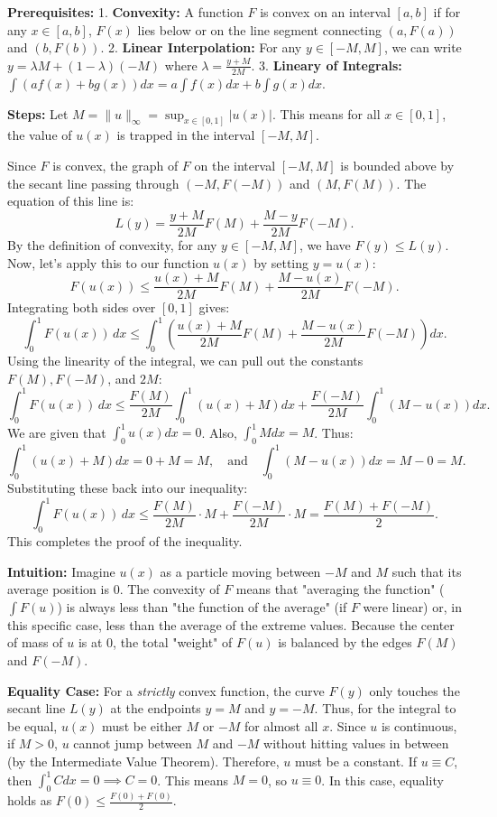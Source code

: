 \begin{solution}
\textbf{Prerequisites:}
1. \textbf{Convexity:} A function $F$ is convex on an interval $[a, b]$ if for any $x \in [a, b]$, $F(x)$ lies below or on the line segment connecting $(a, F(a))$ and $(b, F(b))$.
2. \textbf{Linear Interpolation:} For any $y \in [-M, M]$, we can write $y = \lambda M + (1-\lambda)(-M)$ where $\lambda = \frac{y+M}{2M}$.
3. \textbf{Lineary of Integrals:} $\int (af(x) + bg(x)) dx = a \int f(x) dx + b \int g(x) dx$.

\textbf{Steps:}
Let $M = \|u\|_{\infty} = \sup_{x\in[0,1]}|u(x)|$. This means for all $x \in [0, 1]$, the value of $u(x)$ is trapped in the interval $[-M, M]$.

Since $F$ is convex, the graph of $F$ on the interval $[-M, M]$ is bounded above by the secant line passing through $(-M, F(-M))$ and $(M, F(M))$. The equation of this line is:
\[
L(y) = \frac{y+M}{2M} F(M) + \frac{M-y}{2M} F(-M).
\]
By the definition of convexity, for any $y \in [-M, M]$, we have $F(y) \leq L(y)$. Now, let's apply this to our function $u(x)$ by setting $y = u(x)$:
\[
F(u(x)) \leq \frac{u(x)+M}{2M} F(M) + \frac{M-u(x)}{2M} F(-M).
\]
Integrating both sides over $[0, 1]$ gives:
\[
\int_0^1 F(u(x))\,dx \leq \int_0^1 \left( \frac{u(x)+M}{2M} F(M) + \frac{M-u(x)}{2M} F(-M) \right) dx.
\]
Using the linearity of the integral, we can pull out the constants $F(M), F(-M)$, and $2M$:
\[
\int_0^1 F(u(x))\,dx \leq \frac{F(M)}{2M} \int_0^1 (u(x)+M) dx + \frac{F(-M)}{2M} \int_0^1 (M-u(x)) dx.
\]
We are given that $\int_0^1 u(x) dx = 0$. Also, $\int_0^1 M dx = M$. Thus:
\[
\int_0^1 (u(x)+M) dx = 0 + M = M, \quad \text{and} \quad \int_0^1 (M-u(x)) dx = M - 0 = M.
\]
Substituting these back into our inequality:
\[
\int_0^1 F(u(x))\,dx \leq \frac{F(M)}{2M} \cdot M + \frac{F(-M)}{2M} \cdot M = \frac{F(M) + F(-M)}{2}.
\]
This completes the proof of the inequality.

\textbf{Intuition:}
Imagine $u(x)$ as a particle moving between $-M$ and $M$ such that its average position is $0$. The convexity of $F$ means that "averaging the function" ($\int F(u)$) is always less than "the function of the average" (if $F$ were linear) or, in this specific case, less than the average of the extreme values. Because the center of mass of $u$ is at $0$, the total "weight" of $F(u)$ is balanced by the edges $F(M)$ and $F(-M)$.

\textbf{Equality Case:}
For a \textit{strictly} convex function, the curve $F(y)$ only touches the secant line $L(y)$ at the endpoints $y=M$ and $y=-M$. Thus, for the integral to be equal, $u(x)$ must be either $M$ or $-M$ for almost all $x$. Since $u$ is continuous, if $M > 0$, $u$ cannot jump between $M$ and $-M$ without hitting values in between (by the Intermediate Value Theorem). Therefore, $u$ must be a constant. If $u \equiv C$, then $\int_0^1 C dx = 0 \implies C=0$. This means $M=0$, so $u \equiv 0$. In this case, equality holds as $F(0) \leq \frac{F(0)+F(0)}{2}$.
\end{solution}

